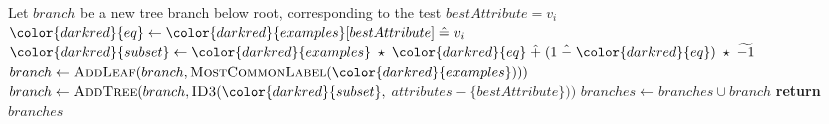 \begin{algorithm}[H]
\begin{algorithmic}[1]
        \State Let $branch$ be a new tree branch below root, corresponding to the test $bestAttribute = v_i$
      \State ${\color{darkred}{eq}} \gets {\color{darkred}{examples}}[bestAttribute] \heq v_i$ 
      \State ${\color{darkred}{subset}} \gets {\color{darkred}{examples}} \hmul {\color{darkred}{eq}} \hplus (1 \hminus {\color{darkred}{eq}}) \hmul \enc{-1} $ 
            \State $branch \gets \textsc{AddLeaf}(branch, \textsc{MostCommonLabel}({\color{darkred}{examples}})))$ 
        \Else
            \State $branch \gets \textsc{AddTree}(branch, \textsc{ID3}({\color{darkred}{subset}},$ $attributes - \{bestAttribute\}))$ 
        \EndIf
        \State $branches \gets branches \cup branch$
    \EndFor
    \State \textbf{return} $branches$

\EndProcedure

\end{algorithmic}
\end{algorithm}

